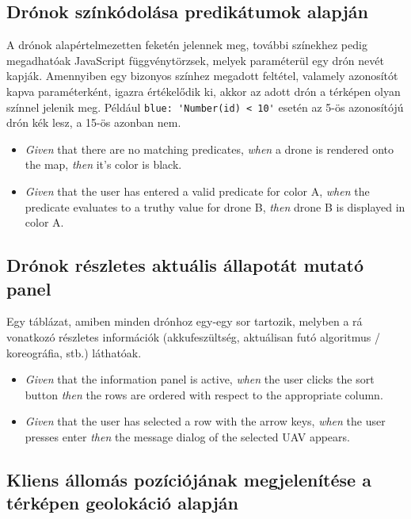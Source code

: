 \subsection{Drónok színkódolása predikátumok alapján}

A drónok alapértelmezetten feketén jelennek meg, további színekhez pedig megadhatóak JavaScript függvénytörzsek, melyek paraméterül egy drón nevét kapják.
Amennyiben egy bizonyos színhez megadott feltétel, valamely azonosítót kapva paraméterként, igazra értékelődik ki, akkor az adott drón a térképen olyan színnel jelenik meg.
Például \verb|blue: 'Number(id) < 10'| esetén az 5-ös azonosítójú drón kék lesz, a 15-ös azonban nem.

\begin {itemize}
  \item \textit{Given} that there are no matching predicates, \textit{when} a drone is rendered onto the map, \textit{then} it's color is black.
  \item \textit{Given} that the user has entered a valid predicate for color A, \textit{when} the predicate evaluates to a truthy value for drone B, \textit{then} drone B is displayed in color A.
\end {itemize}


\subsection{Drónok részletes aktuális állapotát mutató panel}

Egy táblázat, amiben minden drónhoz egy-egy sor tartozik, melyben a rá vonatkozó részletes információk (akkufeszültség, aktuálisan futó algoritmus / koreográfia, stb.) láthatóak.

\begin {itemize}
  \item \textit{Given} that the information panel is active, \textit{when} the user clicks the sort button \textit{then} the rows are ordered with respect to the appropriate column.
  \item \textit{Given} that the user has selected a row with the arrow keys, \textit{when} the user presses enter \textit{then} the message dialog of the selected UAV appears.
\end {itemize}


\subsection{Kliens állomás pozíciójának megjelenítése a térképen geolokáció alapján}

